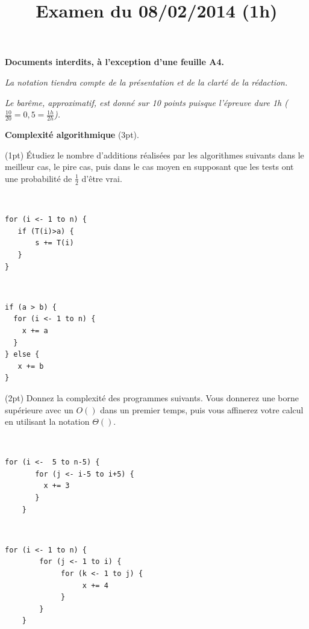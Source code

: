 \documentclass[10pt]{article}\usepackage[nu]{esial}
\begin{document}
\title{Examen du 08/02/2014 (1h)}
\maketitle

\begin{centering}
  \textbf{\large Documents interdits, à l'exception d'une feuille A4.}

  \textit{La notation tiendra compte de la présentation et de la
    clarté de la rédaction.}

  \textit{Le barême, approximatif, est donné sur 10 points puisque l'épreuve
    dure 1h ($\frac{10}{20}=0,5=\frac{1h}{2h}$).}
\end{centering}
\bigskip

\Exercice \textbf{Complexité algorithmique} (3pt).

\Question(1pt) Étudiez le nombre d'additions réalisées par les
algorithmes suivants dans le meilleur cas, le pire cas, puis dans le
cas moyen en supposant que les tests ont une probabilité de
$\frac{1}{2}$ d'être vrai.

\medskip~~~~~~~~~~~~%
\begin{minipage}{.3\linewidth}
\begin{Verbatim}[label=Listing 1.a]
for (i <- 1 to n) {
   if (T(i)>a) {
       s += T(i)
   }
}  
\end{Verbatim}  
\end{minipage}~~~~~~~~~~~~~\begin{minipage}{.3\linewidth}
\begin{Verbatim}[label=Listing 1.b]
if (a > b) {
  for (i <- 1 to n) {
    x += a 
  }
} else {
   x += b
}
\end{Verbatim}
\end{minipage}

\Question(2pt) Donnez la complexité des programmes suivants. Vous
donnerez une borne supérieure avec un $O()$ dans un premier temps,
puis vous affinerez votre calcul en utilisant la notation $\Theta()$.

\medskip~~~~~~~~~~~~%
\begin{minipage}{.3\linewidth}
  \begin{Verbatim}[gobble=4,label=Listing 2.a]
    for (i <-  5 to n-5) {
       for (j <- i-5 to i+5) {
         x += 3    
       }
    }
  \end{Verbatim}
\end{minipage}~~~~~~~~~~~~~\begin{minipage}{.3\linewidth}
\begin{Verbatim}[gobble=4,label=Listing 2.b]
    for (i <- 1 to n) {
        for (j <- 1 to i) {
             for (k <- 1 to j) {
                  x += 4
             }
        }
    }
\end{Verbatim}
\end{minipage}
\end{document}
